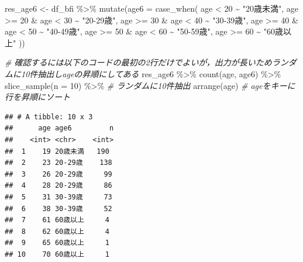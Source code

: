 \documentclass[
  xelatex,ja=standard, b5paper]{bxjsbook}
\newenvironment{Shaded}{\begin{snugshade}}{\end{snugshade}}
\newcommand{\AttributeTok}[1]{\textcolor[rgb]{0.77,0.63,0.00}{#1}}
\newcommand{\CommentTok}[1]{\textcolor[rgb]{0.56,0.35,0.01}{\textit{#1}}}
\newcommand{\DecValTok}[1]{\textcolor[rgb]{0.00,0.00,0.81}{#1}}
\newcommand{\FunctionTok}[1]{\textcolor[rgb]{0.00,0.00,0.00}{#1}}
\newcommand{\NormalTok}[1]{#1}
\newcommand{\OtherTok}[1]{\textcolor[rgb]{0.56,0.35,0.01}{#1}}
\newcommand{\SpecialCharTok}[1]{\textcolor[rgb]{0.00,0.00,0.00}{#1}}
\newcommand{\StringTok}[1]{\textcolor[rgb]{0.31,0.60,0.02}{#1}}
\begin{document}
\begin{Shaded}
\begin{Highlighting}[]
\NormalTok{res\_age6 }\OtherTok{\textless{}{-}} 
\NormalTok{  df\_bfi }\SpecialCharTok{\%\textgreater{}\%} 
  \FunctionTok{mutate}\NormalTok{(}\AttributeTok{age6 =} \FunctionTok{case\_when}\NormalTok{(}
\NormalTok{    age }\SpecialCharTok{\textless{}} \DecValTok{20}              \SpecialCharTok{\textasciitilde{}} \StringTok{"20歳未満"}\NormalTok{, }
\NormalTok{    age }\SpecialCharTok{\textgreater{}=} \DecValTok{20}  \SpecialCharTok{\&}\NormalTok{ age }\SpecialCharTok{\textless{}} \DecValTok{30} \SpecialCharTok{\textasciitilde{}} \StringTok{"20{-}29歳"}\NormalTok{, }
\NormalTok{    age }\SpecialCharTok{\textgreater{}=} \DecValTok{30}  \SpecialCharTok{\&}\NormalTok{ age }\SpecialCharTok{\textless{}} \DecValTok{40} \SpecialCharTok{\textasciitilde{}} \StringTok{"30{-}39歳"}\NormalTok{,}
\NormalTok{    age }\SpecialCharTok{\textgreater{}=} \DecValTok{40}  \SpecialCharTok{\&}\NormalTok{ age }\SpecialCharTok{\textless{}} \DecValTok{50} \SpecialCharTok{\textasciitilde{}} \StringTok{"40{-}49歳"}\NormalTok{,}
\NormalTok{    age }\SpecialCharTok{\textgreater{}=} \DecValTok{50}  \SpecialCharTok{\&}\NormalTok{ age }\SpecialCharTok{\textless{}} \DecValTok{60} \SpecialCharTok{\textasciitilde{}} \StringTok{"50{-}59歳"}\NormalTok{,}
\NormalTok{    age }\SpecialCharTok{\textgreater{}=} \DecValTok{60}             \SpecialCharTok{\textasciitilde{}} \StringTok{"60歳以上"}  
\NormalTok{  ))}

\CommentTok{\# 確認するには以下のコードの最初の2行だけでよいが，出力が長いためランダムに10件抽出しageの昇順にしてある}
\NormalTok{res\_age6 }\SpecialCharTok{\%\textgreater{}\%} 
  \FunctionTok{count}\NormalTok{(age, age6) }\SpecialCharTok{\%\textgreater{}\%} 
  \FunctionTok{slice\_sample}\NormalTok{(}\AttributeTok{n =} \DecValTok{10}\NormalTok{) }\SpecialCharTok{\%\textgreater{}\%} \CommentTok{\# ランダムに10件抽出}
  \FunctionTok{arrange}\NormalTok{(age)             }\CommentTok{\# ageをキーに行を昇順にソート}
\end{Highlighting}
\end{Shaded}

\begin{verbatim}
## # A tibble: 10 x 3
##      age age6         n
##    <int> <chr>    <int>
##  1    19 20歳未満   190
##  2    23 20-29歳    138
##  3    26 20-29歳     99
##  4    28 20-29歳     86
##  5    31 30-39歳     73
##  6    38 30-39歳     52
##  7    61 60歳以上     4
##  8    62 60歳以上     4
##  9    65 60歳以上     1
## 10    70 60歳以上     1
\end{verbatim}
\end{document}

